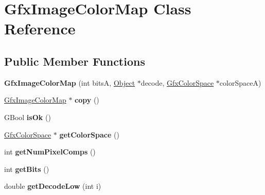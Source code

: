 \hypertarget{class_gfx_image_color_map}{}\section{Gfx\+Image\+Color\+Map Class Reference}
\label{class_gfx_image_color_map}
\subsection*{Public Member Functions}
\begin{DoxyCompactItemize}
\item 
\mbox{\label{class_gfx_image_color_map_aa75e808972d0d3b6b653f37ecacfa6c8}} 
{\bfseries Gfx\+Image\+Color\+Map} (int bitsA, \hyperlink{class_object}{Object} $\ast$decode, \hyperlink{class_gfx_color_space}{Gfx\+Color\+Space} $\ast$color\+SpaceA)
\item 
\mbox{\label{class_gfx_image_color_map_a336638ac50cc5554034555c065bf2bd2}} 
\hyperlink{class_gfx_image_color_map}{Gfx\+Image\+Color\+Map} $\ast$ {\bfseries copy} ()
\item 
\mbox{\label{class_gfx_image_color_map_a9602b186d38d61684403f2db6cd3fc84}} 
G\+Bool {\bfseries is\+Ok} ()
\item 
\mbox{\label{class_gfx_image_color_map_a2454b2cb4c7f50054317bcf0c1848317}} 
\hyperlink{class_gfx_color_space}{Gfx\+Color\+Space} $\ast$ {\bfseries get\+Color\+Space} ()
\item 
\mbox{\label{class_gfx_image_color_map_a4b2b7ac15dc35f6a5b514e970fbef27b}} 
int {\bfseries get\+Num\+Pixel\+Comps} ()
\item 
\mbox{\label{class_gfx_image_color_map_a14434f7863b8066c40baddd766b7cc5c}} 
int {\bfseries get\+Bits} ()
\item 
\mbox{\label{class_gfx_image_color_map_a01f70a354a0071064e49e5d91568e14a}} 
double {\bfseries get\+Decode\+Low} (int i)
\item 
\mbox{\label{class_gfx_image_color_map_a57967ee9a8824ec1fcd0269cc4315db0}} 

\end{DoxyCompactItemize}
